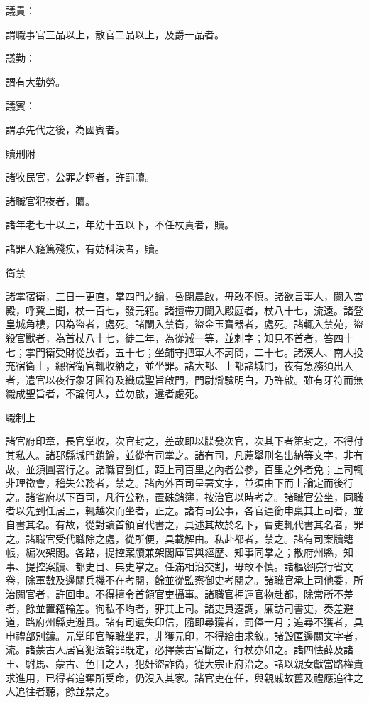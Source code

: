 \begin{pinyinscope}
 議貴：



 謂職事官三品以上，散官二品以上，及爵一品者。



 議勤：



 謂有大勤勞。



 議賓：



 謂承先代之後，為國賓者。



 贖刑附



 諸牧民官，公罪之輕者，許罰贖。



 諸職官犯夜者，贖。



 諸年老七十以上，年幼十五以下，不任杖責者，贖。



 諸罪人癃篤殘疾，有妨科決者，贖。



 衛禁



 諸掌宿衛，三日一更直，掌四門之鑰，昏閉晨啟，毋敢不慎。諸欲言事人，闌入宮殿，呼冀上聞，杖一百七，發元籍。諸擅帶刀闌入殿庭者，杖八十七，流遠。諸登皇城角樓，因為盜者，處死。諸闌入禁衛，盜金玉寶器者，處死。諸輒入禁苑，盜殺官獸者，為首杖八十七，徒二年，為從減一等，並刺字；知見不首者，笞四十七；掌門衛受財從放者，五十七；坐鋪守把軍人不訶問，二十七。諸漢人、南人投充宿衛士，總宿衛官輒收納之，並坐罪。諸大都、上都諸城門，夜有急務須出入者，遣官以夜行象牙圓符及織成聖旨啟門，門尉辯驗明白，乃許啟。雖有牙符而無織成聖旨者，不論何人，並勿啟，違者處死。



 職制上



 諸官府印章，長官掌收，次官封之，差故即以牒發次官，次其下者第封之，不得付其私人。諸郡縣城門鎖鑰，並從有司掌之。諸有司，凡薦舉刑名出納等文字，非有故，並須圓署行之。諸職官到任，距上司百里之內者公參，百里之外者免；上司輒非理徵會，稽失公務者，禁之。諸內外百司呈署文字，並須由下而上論定而後行之。諸省府以下百司，凡行公務，置硃銷簿，按治官以時考之。諸職官公坐，同職者以先到任居上，輒越次而坐者，正之。諸有司公事，各官連銜申稟其上司者，並自書其名。有故，從對讀首領官代書之，具述其故於名下，曹吏輒代書其名者，罪之。諸職官受代職除之處，從所便，具載解由。私赴都者，禁之。諸有司案牘籍帳，編次架閣。各路，提控案牘兼架閣庫官與經歷、知事同掌之；散府州縣，知事、提控案牘、都史目、典史掌之。任滿相沿交割，毋敢不慎。諸樞密院行省文卷，除軍數及邊關兵機不在考閱，餘並從監察御史考閱之。諸職官承上司他委，所治闕官者，許回申。不得擅令首領官吏攝事。諸職官押運官物赴都，除常所不差者，餘並置籍輪差。徇私不均者，罪其上司。諸吏員遷調，廉訪司書吏，奏差避道，路府州縣吏避貫。諸有司遺失印信，隨即尋獲者，罰俸一月；追尋不獲者，具申禮部別鑄。元掌印官解職坐罪，非獲元印，不得給由求敘。諸毀匿邊關文字者，流。諸蒙古人居官犯法論罪既定，必擇蒙古官斷之，行杖亦如之。諸四怯薛及諸王、駙馬、蒙古、色目之人，犯奸盜詐偽，從大宗正府治之。諸以親女獻當路權貴求進用，已得者追奪所受命，仍沒入其家。諸官吏在任，與親戚故舊及禮應追往之人追往者聽，餘並禁之。




\end{pinyinscope}
